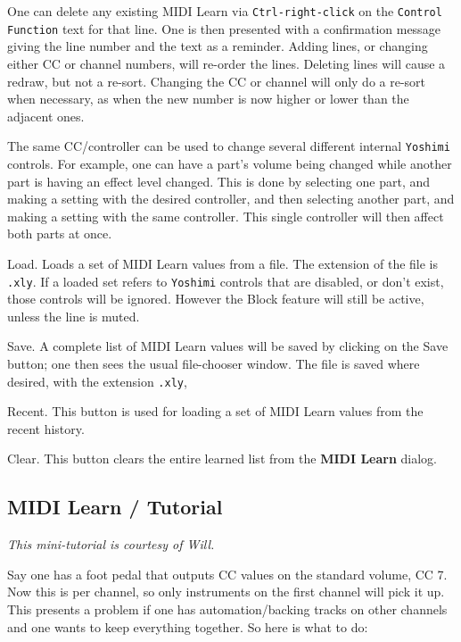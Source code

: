    One can delete any existing MIDI Learn via
   \texttt{Ctrl-right-click}
   on the
   \texttt{Control Function} text for that line.
   One is then presented with a confirmation message giving the line number and
   the text as a reminder.
   Adding lines, or changing either CC or channel numbers, will
   re-order the lines.
   Deleting lines will cause a redraw, but not a re-sort.
   Changing the CC or channel will only do a re-sort when necessary, as when the
   new number is now higher or lower than the adjacent ones.

   The same CC/controller can be used to change several different internal
   \texttt{Yoshimi} controls.  For example, one can have a part's volume being
   changed while another part is having an effect level changed.
   This is done by selecting one part, and making a setting with the desired
   controller, and then selecting another part, and making a setting with the
   same controller.
   This single controller will then affect both parts at once.

   Load.
   Loads a set of MIDI Learn values from a file.
   The extension of the file is \texttt{.xly}.
   If a loaded set refers to \texttt{Yoshimi}
   controls that are disabled, or don't exist, those controls will be ignored.
   However the Block feature will still be active, unless the line is muted.

   Save.
   A complete list of MIDI Learn values
   will be saved by clicking on the Save button; one then sees
   the usual file-chooser window.
   The file is saved where desired, with the extension \texttt{.xly},

   Recent.
   This button is used for loading a set of
   MIDI Learn values from the recent history.

   Clear.
   This button clears the entire learned list from the
   \textbf{MIDI Learn} dialog.


\subsection{MIDI Learn / Tutorial}
\label{subsec:midi_learn_tutorial}

   \textsl{This mini-tutorial is courtesy of Will.}

   Say one has a foot pedal that outputs CC values on the standard volume, CC 7.
   Now this is per channel, so only instruments on the first channel will pick
   it up.  This presents a problem if one has automation/backing tracks on
   other channels and one wants to keep everything together. So here is what to
   do:

